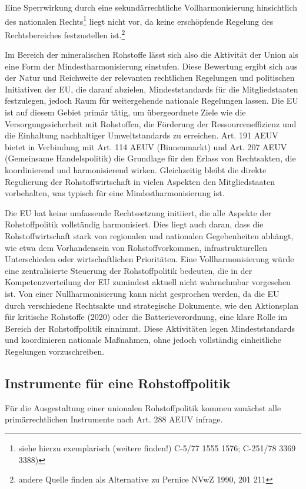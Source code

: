 \documentclass[12pt,a4paper,oneside]{book} %
\begin{document}
	
Eine Sperrwirkung durch eine sekundärrechtliche Vollharmonisierung hinsichtlich des nationalen Rechts\footnote{siehe hierzu exemplarisch (weitere finden!) C-5/77 1555 1576; C-251/78 3369 3388)} liegt nicht vor, da keine erschöpfende Regelung des Rechtsbereiches festzustellen ist.\footnote{andere Quelle finden als Alternative zu Pernice NVwZ 1990, 201 211}
	
Im Bereich der mineralischen Rohstoffe lässt sich also die Aktivität der Union als eine Form der Mindestharmonisierung einstufen.  Diese Bewertung ergibt sich aus der Natur und Reichweite der relevanten rechtlichen Regelungen und politischen Initiativen der EU, die darauf abzielen, Mindeststandards für die Mitgliedstaaten festzulegen, jedoch Raum für weitergehende nationale Regelungen lassen. Die EU ist auf diesem Gebiet primär tätig, um übergeordnete Ziele wie die Versorgungssicherheit mit Rohstoffen, die Förderung der Ressourceneffizienz und die Einhaltung nachhaltiger Umweltstandards zu erreichen. Art. 191 AEUV bietet in Verbindung mit Art. 114 AEUV (Binnenmarkt) und Art. 207 AEUV (Gemeinsame Handelspolitik) die Grundlage für den Erlass von Rechtsakten, die koordinierend und harmonisierend wirken. Gleichzeitig bleibt die direkte Regulierung der Rohstoffwirtschaft in vielen Aspekten den Mitgliedstaaten vorbehalten, was typisch für eine Mindestharmonisierung ist.
	
Die EU hat keine umfassende Rechtssetzung initiiert, die alle Aspekte der Rohstoffpolitik vollständig harmonisiert. Dies liegt auch daran, dass die Rohstoffwirtschaft stark von regionalen und nationalen Gegebenheiten abhängt, wie etwa dem Vorhandensein von Rohstoffvorkommen, infrastrukturellen Unterschieden oder wirtschaftlichen Prioritäten. Eine Vollharmonisierung würde eine zentralisierte Steuerung der Rohstoffpolitik bedeuten, die in der Kompetenzverteilung der EU zumindest aktuell nicht wahrnehmbar vorgesehen ist. Von einer Nullharmonisierung kann nicht gesprochen werden, da die EU durch verschiedene Rechtsakte und strategische Dokumente, wie den Aktionsplan für kritische Rohstoffe (2020) oder die Batterieverordnung, eine klare Rolle im Bereich der Rohstoffpolitik einnimmt. Diese Aktivitäten legen Mindeststandards und koordinieren nationale Maßnahmen, ohne jedoch vollständig einheitliche Regelungen vorzuschreiben.
	
\subsection{Instrumente für eine Rohstoffpolitik}
Für die Ausgestaltung einer unionalen Rohstoffpolitik kommen zunächst alle primärrechtlichen Instrumente nach Art. 288 AEUV infrage.
	
\end{document}

